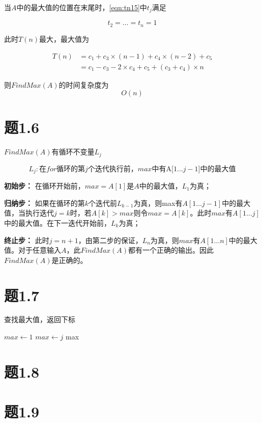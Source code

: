 \documentclass[a4paper,twoside]{article}
\begin{document}
\begin{spacing}{1.2}
当$A$中的最大值的位置在末尾时，\eqref{eqn:tn15}中$t_j$满足

$$
t_2=\dots=t_n=1
$$

此时$T(n)$最大，最大值为

\begin{align*}
T(n) & =c_1 + c_3 \times (n-1) + c_4 \times (n-2) + c_5 \\
& = c_1 - c_3 - 2 \times c_4 +c_5 + (c_3+c_4) \times n  
\end{align*}

则$FindMax(A)$的时间复杂度为
$$
O(n)
$$

\section{题1.6}

$FindMax(A)$有循环不变量$L_j$

$$
L_j: \mbox{在$for$循环的第$j$个迭代执行前，$max$中有A[$1 \dots j-1$]中的最大值}
$$

\textbf{初始步：} 在循环开始前，$max=A[1]$是$A$中的最大值，$L_1$为真；

\textbf{归纳步：} 如果在循环的第$k$个迭代前$L_{k-1}$为真，则max有$A[1 \dots j-1]$中的最大值，当执行迭代$j=k$时，若$A[k] > max$则令$max=A[k]$。此时$max$有$A[1 \dots j]$中的最大值。在下一迭代开始前，$L_k$为真；

\textbf{终止步：} 此时$j=n+1$，由第二步的保证，$L_n$为真，则$max$有$A[1 \dots n]$中的最大值。对于任意输入$A$，此$FindMax(A)$都有一个正确的输出。因此$FindMax(A)$是正确的。

\section{题1.7}

\begin{algorithm}
	\caption{查找最大值，返回下标}
	\begin{algorithmic}[1]
		\State $max \gets 1$
		\State $max \gets j$
		\EndIf
		\EndFor
		\Return max
		\EndProcedure
		
	\end{algorithmic}
\end{algorithm}

\section{题1.8}

\section{题1.9}


\end{spacing}
\end{document}
